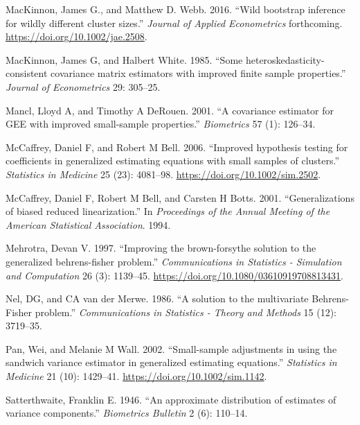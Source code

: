 \documentclass[12pt]{article}
\newlength{\cslhangindent}
\newlength{\cslentryspacingunit} %
\newenvironment{CSLReferences}[2] %
 {%
  \setlength{\parindent}{0pt}
  \ifodd #1
  \let\oldpar\par
  \def\par{\hangindent=\cslhangindent\oldpar}
  \fi
  \setlength{\parskip}{#2\cslentryspacingunit}
 }%
 {}
\begin{document}
\begin{CSLReferences}{1}{0}
\leavevmode{}%
MacKinnon, James G., and Matthew D. Webb. 2016. {``{Wild bootstrap
inference for wildly different cluster sizes}.''} \emph{Journal of
Applied Econometrics} forthcoming.
\url{https://doi.org/10.1002/jae.2508}.

\leavevmode{}%
MacKinnon, James G, and Halbert White. 1985. {``{Some
heteroskedasticity-consistent covariance matrix estimators with improved
finite sample properties}.''} \emph{Journal of Econometrics} 29:
305--25.

\leavevmode{}%
Mancl, Lloyd A, and Timothy A DeRouen. 2001. {``{A covariance estimator
for GEE with improved small-sample properties}.''} \emph{Biometrics} 57
(1): 126--34.

\leavevmode{}%
McCaffrey, Daniel F, and Robert M Bell. 2006. {``{Improved hypothesis
testing for coefficients in generalized estimating equations with small
samples of clusters.}''} \emph{Statistics in Medicine} 25 (23):
4081--98. \url{https://doi.org/10.1002/sim.2502}.

\leavevmode{}%
McCaffrey, Daniel F, Robert M Bell, and Carsten H Botts. 2001.
{``{Generalizations of biased reduced linearization}.''} In
\emph{Proceedings of the Annual Meeting of the American Statistical
Association}. 1994.

\leavevmode{}%
Mehrotra, Devan V. 1997. {``{Improving the brown-forsythe solution to
the generalized behrens-fisher problem}.''} \emph{Communications in
Statistics - Simulation and Computation} 26 (3): 1139--45.
\url{https://doi.org/10.1080/03610919708813431}.

\leavevmode{}%
Nel, DG, and CA van der Merwe. 1986. {``{A solution to the multivariate
Behrens-Fisher problem}.''} \emph{Communications in Statistics - Theory
and Methods} 15 (12): 3719--35.

\leavevmode{}%
Pan, Wei, and Melanie M Wall. 2002. {``{Small-sample adjustments in
using the sandwich variance estimator in generalized estimating
equations.}''} \emph{Statistics in Medicine} 21 (10): 1429--41.
\url{https://doi.org/10.1002/sim.1142}.

\leavevmode{}%
Satterthwaite, Franklin E. 1946. {``{An approximate distribution of
estimates of variance components}.''} \emph{Biometrics Bulletin} 2 (6):
110--14.


\end{CSLReferences}
\end{document}
